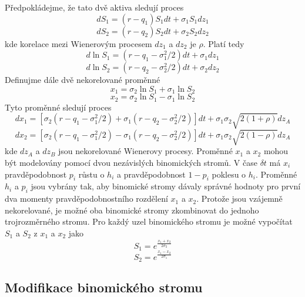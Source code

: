 \documentclass[a4paper]{book}
\begin{document}
Předpokládejme, že tato dvě aktiva sledují proces
\begin{equation*}
dS_1 = (r-q_1)S_1 dt + \sigma_1 S_1 dz_1
\end{equation*}
\begin{equation*}
d S_2 = (r-q_2)S_2dt+\sigma_2 S_2 dz_2
\end{equation*}
kde korelace mezi Wienerovým procesem $dz_1$ a $dz_2$ je $\rho$. Platí tedy
\begin{equation*}
d \ln S_1 = (r-q_1-\sigma_1^2/2)dt + \sigma_1 dz_1 
\end{equation*}
\begin{equation*}
d \ln S_2 = (r-q_2-\sigma_2^2/2)dt + \sigma_2 dz_2
\end{equation*}
Definujme dále dvě nekorelované proměnné
\begin{equation*}
x_1 = \sigma_2 \ln S_1 + \sigma_1 \ln S_2
\end{equation*}
\begin{equation*}
x_2 = \sigma_2 \ln S_1 - \sigma_1 \ln S_2
\end{equation*}
Tyto proměnné sledují proces
\begin{equation*}
dx_1 = [\sigma_2(r-q_1-\sigma^2_1/2)+\sigma_1(r-q_2-\sigma^2_2/2)]dt+\sigma_1 \sigma_2 \sqrt{2(1+\rho)}dz_A
\end{equation*}
\begin{equation*}
dx_2 = [\sigma_2(r-q_1-\sigma^2_1/2)-\sigma_1(r-q_2-\sigma^2_2/2)]dt+\sigma_1 \sigma_2 \sqrt{2(1-\rho)}dz_A
\end{equation*}
kde $dz_A$ a $dz_B$ jsou nekorelované Wienerovy procesy. Proměnné $x_1$ a $x_2$ mohou být modelovány pomocí dvou nezávislých binomických stromů. V čase $\delta t$ má $x_i$ pravděpodobnost $p_i$ růstu o $h_i$ a pravděpodobnost $1-p_i$ poklesu o $h_i$. Proměnné $h_i$ a $p_i$ jsou vybrány tak, aby binomické stromy dávaly správné hodnoty pro první dva momenty pravděpodobnostního rozdělení $x_1$ a $x_2$. Protože jsou vzájemně nekorelované, je možné oba binomické stromy zkombinovat do jednoho trojrozměrného stromu. Pro každý uzel binomického stromu je možné vypočítat $S_1$ a $S_2$ z $x_1$ a $x_2$ jako
\begin{equation*}
S_1 = e^{\frac{x_1 + x_2}{2\sigma_2}}
\end{equation*}
\begin{equation*}
S_2 = e^{\frac{x_1 - x_2}{2\sigma_1}}
\end{equation*}

\subsection{Modifikace binomického stromu}
\end{document}
